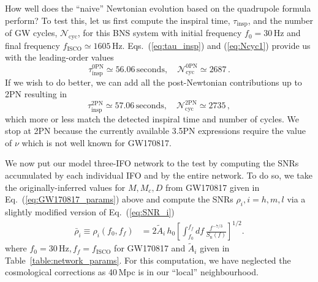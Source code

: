 \documentclass[prd,amsmath,amssymb,aps,floats,amsfonts,notitlepage,superscriptaddress,eqsecnum,nofootinbib,10pt]{revtex4-1}
\newcommand{\f}{\frac}
\newcommand{\be}{\begin{equation}}
\newcommand{\ee}{\end{equation}}
\begin{document}
How well does the ``naive'' Newtonian evolution based on the quadrupole formula perform? 
To test this, let us first compute the inspiral time, $\tau_\text{insp}$, and the number of GW cycles, $\mathcal{N}_\text{cyc}$, for this BNS system with initial frequency $f_0=30\,$Hz and final frequency $f_\text{ISCO} \simeq 1605\,$Hz. 
Eqs.~(\ref{eq:tau_insp}) and (\ref{eq:Ncyc1}) provide us with the leading-order values
%
\be
\tau_\text{insp}^{0\text{PN}} \simeq 56.06\,\text{seconds}, \quad \mathcal{N}_\text{cyc}^{0\text{PN}} \simeq 2687\,\label{eq:GW170817_values_0PN}. 
\ee
%
If we wish to do better, we can add all the post-Newtonian contributions up to 2PN resulting in
%
\be
\tau_\text{insp}^{2\text{PN}} \simeq 57.06\,\text{seconds}, \quad \mathcal{N}_\text{cyc}^{2\text{PN}} \simeq 2735 \label{eq:GW170817_values_3p5PN}\, ,
\ee
%
which more or less match the detected inspiral time and number of cycles. We stop at 2PN because the currently available 3.5PN expressions require the value of $\nu$
which is not well known for GW170817.
%

We now put our model three-IFO network to the test
by computing the SNRs accumulated by each individual IFO and by the entire network. To do so, we take the originally-inferred values for $M,M_c,D$ from GW170817 given in Eq.~(\ref{eq:GW170817_params}) above and compute the SNRs $\rho_i, i=h,m,l$ via a slightly modified version of Eq.~(\ref{eq:SNR_i})
%
\begin{align}
\bar{\rho}_i\equiv\rho_i(f_0,f_f) &= 2\tilde{A}_i\, h_0\left[ \int_{f_0}^{f_f} df\, \f{f^{-7/3}}{S_\text{n}(f)}\right]^{1/2} \label{eq:SNR_i_with_fi}.
\end{align}
%
where $f_0 =30\,\text{Hz}, f_f= f_\text{ISCO}$ for GW170817 and $\tilde{A}_i$ given in Table~\ref{table:network_params}.
For this computation, we have neglected the cosmological corrections as 40\,Mpc is in our ``local'' neighbourhood.
\end{document}
